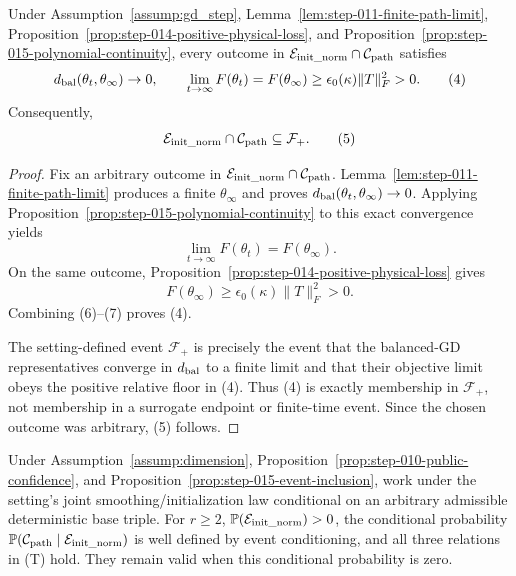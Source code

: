 \begin{proposition}
\label{prop:step-015-event-inclusion}
\leavevmode\par\noindent
Under Assumption~\ref{assump:gd_step}, Lemma~\ref{lem:step-011-finite-path-limit}, Proposition~\ref{prop:step-014-positive-physical-loss}, and
Proposition~\ref{prop:step-015-polynomial-continuity}, every outcome in
\(\mathcal E_{\rm init\_norm}\cap\mathcal C_{\rm path}\) satisfies
\[
  d_{\rm bal}(\theta_t,\theta_\infty)\to0,
  \qquad
  \lim_{t\to\infty}F(\theta_t)
  =F(\theta_\infty)
  \ge\epsilon_0(\kappa)\|T\|_F^2>0.                    \tag{4}
\]
Consequently,
\[
  \mathcal E_{\rm init\_norm}\cap\mathcal C_{\rm path}
  \subseteq\mathcal F_+.                                \tag{5}
\]

\end{proposition}

\begin{proof}
Fix an arbitrary outcome in
\(\mathcal E_{\rm init\_norm}\cap\mathcal C_{\rm path}\). Lemma~\ref{lem:step-011-finite-path-limit} produces a finite
\(\theta_\infty\) and proves
\(d_{\rm bal}(\theta_t,\theta_\infty)\to0\). Applying
Proposition~\ref{prop:step-015-polynomial-continuity} to this exact
convergence yields
\[
  \lim_{t\to\infty}F(\theta_t)=F(\theta_\infty).        \tag{6}
\]
On the same outcome, Proposition~\ref{prop:step-014-positive-physical-loss} gives
\[
  F(\theta_\infty)
  \ge\epsilon_0(\kappa)\|T\|_F^2>0.                    \tag{7}
\]
Combining (6)--(7) proves (4).

The setting-defined event \(\mathcal F_+\) is precisely the event that the
balanced-GD representatives converge in \(d_{\rm bal}\) to a finite limit
and that their objective limit obeys the positive relative floor in (4).
Thus (4) is exactly membership in \(\mathcal F_+\), not membership in a
surrogate endpoint or finite-time event. Since the chosen outcome was
arbitrary, (5) follows. 

\end{proof}


\begin{proposition}
\label{prop:step-015-conditional-accounting}
Under Assumption~\ref{assump:dimension}, Proposition~\ref{prop:step-010-public-confidence}, and
Proposition~\ref{prop:step-015-event-inclusion}, work under the setting's
joint smoothing/initialization law conditional on an arbitrary admissible
deterministic base triple. For \(r\ge2\),
\(\mathbb P(\mathcal E_{\rm init\_norm})>0\), the conditional probability
\(\mathbb P(\mathcal C_{\rm path}\mid
\mathcal E_{\rm init\_norm})\) is well defined by event conditioning, and
all three relations in (T) hold. They remain valid when this conditional
probability is zero.

\end{proposition}

